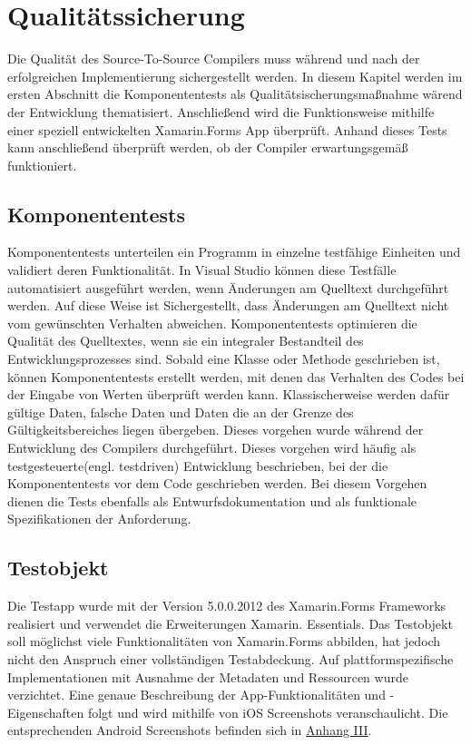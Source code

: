 \chapter{Qualitätssicherung}
\label{chap:Qualitätssicherung}
Die Qualität des Source-To-Source Compilers muss während und nach der erfolgreichen Implementierung sichergestellt werden. In diesem Kapitel werden im ersten Abschnitt die Komponententests als Qualitätsischerungsmaßnahme wärend der Entwicklung thematisiert.  Anschließend wird die Funktionsweise mithilfe einer speziell entwickelten Xamarin.Forms App überprüft.  Anhand dieses Tests kann anschließend überprüft werden, ob  der Compiler erwartungsgemäß funktioniert. 

\section{Komponententests}
Komponententests unterteilen ein Programm in einzelne testfähige Einheiten und validiert deren Funktionalität.  In Visual Studio können diese Testfälle automatisiert ausgeführt werden, wenn Änderungen am Quelltext durchgeführt werden.  Auf diese Weise ist Sichergestellt, dass Änderungen am Quelltext nicht vom gewünschten Verhalten abweichen.  Komponententests optimieren die Qualität des Quelltextes, wenn sie ein integraler Bestandteil des Entwicklungsprozesses sind.  Sobald eine Klasse oder Methode geschrieben ist,  können Komponententests erstellt werden, mit denen das Verhalten des Codes bei der Eingabe von Werten überprüft werden kann.  Klassischerweise werden dafür gültige Daten,  falsche Daten und Daten die an der Grenze des Gültigkeitsbereiches liegen übergeben.  Dieses vorgehen wurde während der Entwicklung des Compilers durchgeführt.  Dieses vorgehen wird häufig als testgesteuerte(engl. testdriven) Entwicklung beschrieben,  bei der die Komponententests vor dem Code geschrieben werden.  Bei diesem Vorgehen dienen die Tests ebenfalls als Entwurfsdokumentation und als funktionale Spezifikationen der Anforderung.



\section{Testobjekt}
Die Testapp wurde mit der Version 5.0.0.2012 des Xamarin.Forms Frameworks realisiert und verwendet die Erweiterungen Xamarin. Essentials.  Das Testobjekt soll möglichst viele Funktionalitäten von Xamarin.Forms abbilden, hat jedoch nicht den Anspruch einer vollständigen Testabdeckung.
Auf plattformspezifische Implementationen mit Ausnahme der Metadaten und Ressourcen wurde verzichtet.  Eine genaue Beschreibung der App-Funktionalitäten und -Eigenschaften folgt und wird mithilfe von iOS Screenshots veranschaulicht.  Die entsprechenden Android Screenshots befinden sich in \hyperref[chap:AnhangAndroidScreenshots]{Anhang III}.

